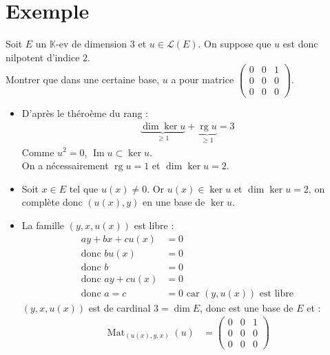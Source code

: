 \documentclass[../main.tex]{subfiles}
\begin{document}
\section{Exemple}
\begin{tcolorbox}[title=Exemple 28.28, title filled=false, colframe=darkgreen, colback=darkgreen!10!white]
    Soit $E$ un $\mathbb{K}$-ev de dimension $3$ et $u\in \mathcal{L}(E)$. On suppose que $u$ est donc nilpotent d'indice $2$. \\
    Montrer que dans une certaine base, $u$ a pour matrice $\begin{pmatrix}
        0 & 0 & 1 \\
        0 & 0 & 0 \\
        0 & 0 & 0
    \end{pmatrix}$. 
\end{tcolorbox}

\begin{itemize}
    \item D'après le théroème du rang : 
    \begin{align*}
        \underbrace{\dim \ker u}_{\geq 1} + \underbrace{\operatorname{rg} u}_{\geq 1} = 3
    \end{align*}
    Comme $u^2 = 0$, $\operatorname{Im} u \subset \ker u$. \\
    On a nécessairement $\operatorname{rg} u = 1$ et $\dim \ker u = 2$. \\

    \item Soit $x\in E$ tel que $u(x) \neq 0$. Or $u(x)\in \ker u$ et $\dim \ker u = 2$, on complète donc $(u(x), y)$ en une base de $\ker u$. 
    
    \item La famille $(y, x, u(x))$ est libre : 
    \begin{align*}
        ay + bx + cu(x) &= 0 \\
        \text{donc } bu(x) &= 0 \\
        \text{donc } b &= 0 \\
        \text{donc } ay + cu(x) &= 0 \\
        \text{donc } a = c &= 0 \text{ car } (y, u(x)) \text{ est libre}
    \end{align*}
    $(y, x, u(x))$ est de cardinal $3 = \dim E$, donc est une base de $E$ et : 
    \begin{align*}
        \operatorname{Mat}_{(u(x), y, x)}(u) &= \begin{pmatrix}
            0 & 0 & 1 \\
            0 & 0 & 0 \\
            0 & 0 & 0
        \end{pmatrix}
    \end{align*}
\end{itemize}
\end{document}
